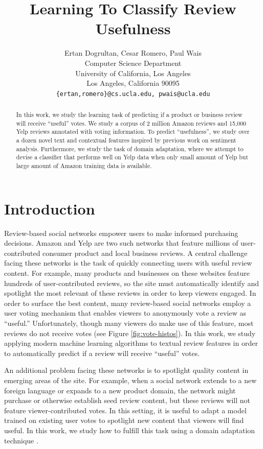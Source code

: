 \documentclass[letterpaper]{article}
\title{Learning To Classify Review Usefulness}
\author{Ertan Dogrultan, Cesar Romero, Paul Wais\\
Computer Science Department \\
University of California, Los Angeles\\
Los Angeles, California 90095\\
\texttt{\{ertan,romero\}@cs.ucla.edu, pwais@ucla.edu}}
\begin{document}
\maketitle
\begin{abstract}
  In this work, we study the learning task of predicting if a product or 
  business review will receive ``useful'' votes.  We study a corpus of
  2 million Amazon reviews and 15,000 Yelp reviews annotated
  with voting information.  To predict ``usefulness'', we study over a dozen 
  novel text and contextual features inspired by previous work on 
  sentiment analysis.  Furthermore, we study the task of domain adaptation,
  where we attempt to devise a classifier that performs well on Yelp data
  when only small amount of Yelp but large amount of Amazon training data
  is available.
\end{abstract}

\section{Introduction}
\label{sec:introduction}

Review-based social networks empower users to make informed purchasing
decisions.  Amazon and Yelp are two such networks that feature
millions of user-contributed consumer product and local business
reviews.  A central challenge facing these networks is the task of
quickly connecting users with useful review content.  For example,
many products and businesses on these websites feature hundreds of
user-contributed reviews, so the site must automatically identify and
spotlight the most relevant of these reviews in order to keep viewers
engaged.  In order to surface the best content, many review-based
social networks employ a user voting mechanism that enables viewers to
anonymously vote a review as ``useful.''  Unfortunately, though many
viewers do make use of this feature, most reviews do not receive votes
(see Figure \ref{fig:vote-histos}).  In this work, we study applying modern
machine learning algorithms to textual review features in order to
automatically predict if a review will receive ``useful'' votes.

An additional problem facing these networks is to spotlight quality
content in emerging areas of the site.  For example, when a social
network extends to a new foreign language or expands to a new product
domain, the network might purchase or otherwise establish seed review
content, but these reviews will not feature viewer-contributed votes.
In this setting, it is useful to adapt a model trained on existing
user votes to spotlight new content that viewers will find useful.  In
this work, we study how to fulfill this task using a domain adaptation
technique \cite{JennLearnDiffDomains}.
\end{document}
